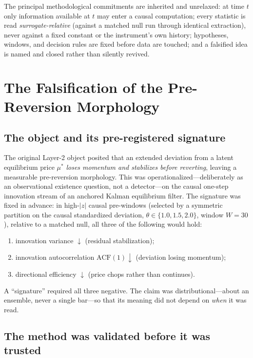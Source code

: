 \documentclass[11pt,a4paper]{article}
\begin{document}
The principal methodological commitments are inherited and unrelaxed: at time $t$ only information
available at $t$ may enter a causal computation; every statistic is read \emph{surrogate-relative}
(against a matched null run through identical extraction), never against a fixed constant or the
instrument's own history; hypotheses, windows, and decision rules are fixed before data are touched;
and a falsified idea is named and closed rather than silently revived.

\section{The Falsification of the Pre-Reversion Morphology}
\label{sec:statet}

\subsection{The object and its pre-registered signature}

The original Layer-2 object posited that an extended deviation from a latent equilibrium price
$\mu^*$ \emph{loses momentum and stabilizes before reverting}, leaving a measurable pre-reversion
morphology. This was operationalized---deliberately as an observational existence question, not a
detector---on the causal one-step innovation stream of an anchored Kalman equilibrium filter. The
signature was fixed in advance: in high-$|z|$ causal pre-windows (selected by a symmetric partition on
the causal standardized deviation, $\theta\in\{1.0,1.5,2.0\}$, window $W=30$), relative to a matched
null, all three of the following would hold:
\begin{enumerate}[label=(D\arabic*),leftmargin=2.4em,itemsep=1pt]
  \item innovation variance $\downarrow$ (residual stabilization);
  \item innovation autocorrelation $\mathrm{ACF}(1)\downarrow$ (deviation losing momentum);
  \item directional efficiency $\downarrow$ (price chops rather than continues).
\end{enumerate}
A ``signature'' required all three negative. The claim was distributional---about an ensemble, never a
single bar---so that its meaning did not depend on \emph{when} it was read.

\subsection{The method was validated before it was trusted}
\end{document}
